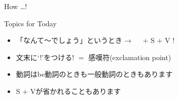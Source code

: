 \documentclass[aspectratio=169,xcolor={dvipsnames,table}]{beamer}
\begin{document}
\begin{frame}[plain]{How \ldots ! }
{\begin{block}{Topics for Today}
\begin{itemize}[square]\small
 \item 「なんて～でしょう」というとき$\longrightarrow$\,\,\,%
\,\,\,$+$ S $+$ V !
 \item 文末に`!'をつける\hfill{\scriptsize ! $=$ 感嘆符(exclamation point)}
 \item 動詞はbe動詞のときも一般動詞のときもあります
 \item S $+$ Vが省かれることもあります
\end{itemize}
     \end{block}
}
\vspace*{-10pt}
\hfill\hyperlink{WHAT}{}
\hypertarget{HOW}{}
\end{frame}
\end{document}
